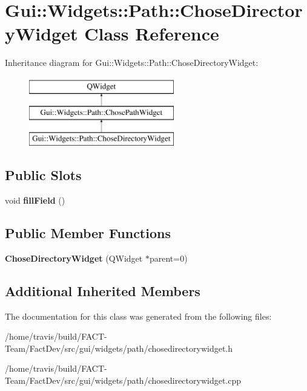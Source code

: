 \hypertarget{classGui_1_1Widgets_1_1Path_1_1ChoseDirectoryWidget}{\section{Gui\-:\-:Widgets\-:\-:Path\-:\-:Chose\-Directory\-Widget Class Reference}
\label{classGui_1_1Widgets_1_1Path_1_1ChoseDirectoryWidget}
}
Inheritance diagram for Gui\-:\-:Widgets\-:\-:Path\-:\-:Chose\-Directory\-Widget\-:\begin{figure}[H]
\begin{center}
\leavevmode
\includegraphics[height=3.000000cm]{dd/d67/classGui_1_1Widgets_1_1Path_1_1ChoseDirectoryWidget}
\end{center}
\end{figure}
\subsection*{Public Slots}
\begin{DoxyCompactItemize}
\item 
\hypertarget{classGui_1_1Widgets_1_1Path_1_1ChoseDirectoryWidget_ab20017ce0bf79bb3961b1328ecab6d9e}{void {\bfseries fill\-Field} ()}\label{classGui_1_1Widgets_1_1Path_1_1ChoseDirectoryWidget_ab20017ce0bf79bb3961b1328ecab6d9e}

\end{DoxyCompactItemize}
\subsection*{Public Member Functions}
\begin{DoxyCompactItemize}
\item 
\hypertarget{classGui_1_1Widgets_1_1Path_1_1ChoseDirectoryWidget_aac9ce6a6c6c8322085f42528d99ac830}{{\bfseries Chose\-Directory\-Widget} (Q\-Widget $\ast$parent=0)}\label{classGui_1_1Widgets_1_1Path_1_1ChoseDirectoryWidget_aac9ce6a6c6c8322085f42528d99ac830}

\end{DoxyCompactItemize}
\subsection*{Additional Inherited Members}


The documentation for this class was generated from the following files\-:\begin{DoxyCompactItemize}
\item 
/home/travis/build/\-F\-A\-C\-T-\/\-Team/\-Fact\-Dev/src/gui/widgets/path/chosedirectorywidget.\-h\item 
/home/travis/build/\-F\-A\-C\-T-\/\-Team/\-Fact\-Dev/src/gui/widgets/path/chosedirectorywidget.\-cpp\end{DoxyCompactItemize}
